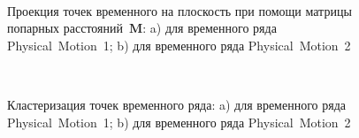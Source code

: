 \begin{figure}[h!t]\center
{}
\\
\caption{Проекция точек временного на плоскость при помощи матрицы попарных расстояний~$\textbf{M}$: a) для временного ряда Physical~Motion~1; b) для временного ряда Physical~Motion~2}
\label{fig_real_2D}
\end{figure}

\begin{figure}[h!t]\center
{}
\\
\caption{Кластеризация точек временного ряда: 
a) для временного ряда Physical~Motion~1; b) для временного ряда Physical~Motion~2}
\label{fig_real_claster}
\end{figure}

